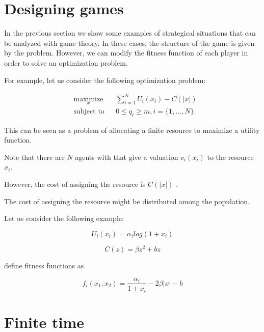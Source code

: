 \documentclass[a4paper,10pt]{article}
\begin{document}
\section{Designing games}

In the previous section we show some examples of strategical situations that can be analyzed with game theory. In these cases, the structure of the game is given by the problem. However, we can modify the fitness function of each player in order to solve an optimization problem.

For example, let us consider the following optimization problem:

\begin{equation}\label{eq:opt_problem}
\begin{aligned}
& \underset{x}{\text{maximize}} 
& & \sum_{i=1}^N U_i(x_i)  - C(|x|)\\
& \text{subject to}
& & 0 \leq q_i \geq m,  i =\{1,\ldots, N\}.
\end{aligned}
\end{equation}

This can be seen as a problem of allocating a finite resource to maximize a utility function. 

Note that there are $N$ agents with that give a valuation $v_i(x_i)$ to the resource $x_i$.

However, the cost of assigning the resource is $C(|x|)$ .

The cost of assigning the resource might be distributed among the population. 

Let us consider the following example:


\begin{equation}
U_i(x_i) =   \alpha_i  log(1+x_i) 
\end{equation}

\begin{equation}
C(z) = \beta z^2 + b z 
\end{equation}

define fitness functions as 

\begin{equation}
f_i(x_1, x_2) = \frac{\alpha_i}{1+x_i} - 2 \beta |x| - b 
\end{equation}











\section{Finite time}
\end{document}
